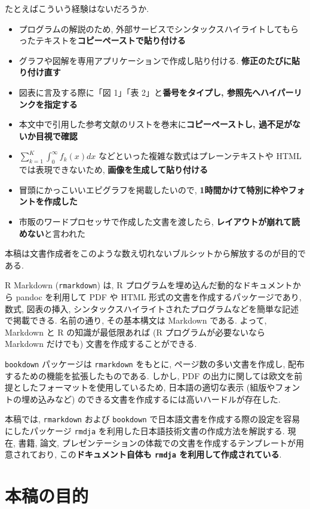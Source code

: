 \documentclass[
  xelatex,ja=standard,jafont=noto]{bxjsbook}
\providecommand{\tightlist}{%
  \setlength{\itemsep}{0pt}\setlength{\parskip}{0pt}}
\theoremstyle{definition}
\theoremstyle{definition}
\theoremstyle{definition}
\theoremstyle{definition}
\theoremstyle{remark}
\begin{document}
たとえばこういう経験はないだろうか.

\begin{itemize}
\tightlist
\item
  プログラムの解説のため,
  外部サービスでシンタックスハイライトしてもらったテキストを\textbf{コピーペーストで貼り付ける}
\item
  グラフや図解を専用アプリケーションで作成し貼り付ける.
  \textbf{修正のたびに貼り付け直す}
\item
  図表に言及する際に「図 1」「表 2」と\textbf{番号をタイプし,
  参照先へハイパーリンクを指定する}
\item
  本文中で引用した参考文献のリストを巻末に\textbf{コピーペーストし,
  過不足がないか目視で確認}
\item
  \(\sum_{k=1}^K\int_0^\infty f_k(x) dx\)
  などといった複雑な数式はプレーンテキストや HTML では表現できないため,
  \textbf{画像を生成して貼り付ける}
\item
  冒頭にかっこいいエピグラフを掲載したいので,
  \textbf{1時間かけて特別に枠やフォントを作成した}
\item
  市販のワードプロセッサで作成した文書を渡したら,
  \textbf{レイアウトが崩れて読めない}と言われた
\end{itemize}

本稿は文書作成者をこのような数え切れないブルシットから解放するのが目的である.

R Markdown (\texttt{rmarkdown}) は, R
プログラムを埋め込んだ動的なドキュメントから pandoc を利用して PDF や
HTML 形式の文書を作成するパッケージであり, 数式, 図表の挿入,
シンタックスハイライトされたプログラムなどを簡単な記述で掲載できる.
名前の通り, その基本構文は Markdown である. よって, Markdown と R
の知識が最低限あれば (R プログラムが必要ないなら Markdown だけでも)
文書を作成することができる.

\texttt{bookdown} パッケージは \texttt{rmarkdown} をもとに,
ページ数の多い文書を作成し, 配布するための機能を拡張したものである.
しかし, PDF
の出力に関しては欧文を前提としたフォーマットを使用しているため,
日本語の適切な表示 (組版やフォントの埋め込みなど)
のできる文書を作成するには高いハードルが存在した.

本稿では, \texttt{rmarkdown} および \texttt{bookdown}
で日本語文書を作成する際の設定を容易にしたパッケージ \texttt{rmdja}
を利用した日本語技術文書の作成方法を解説する. 現在, 書籍, 論文,
プレゼンテーションの体裁での文書を作成するテンプレートが用意されており,
この\textbf{ドキュメント自体も \texttt{rmdja} を利用して作成されている}.

\hypertarget{ux672cux7a3fux306eux76eeux7684}{%
\chapter*{本稿の目的}\label{ux672cux7a3fux306eux76eeux7684}}
\end{document}
